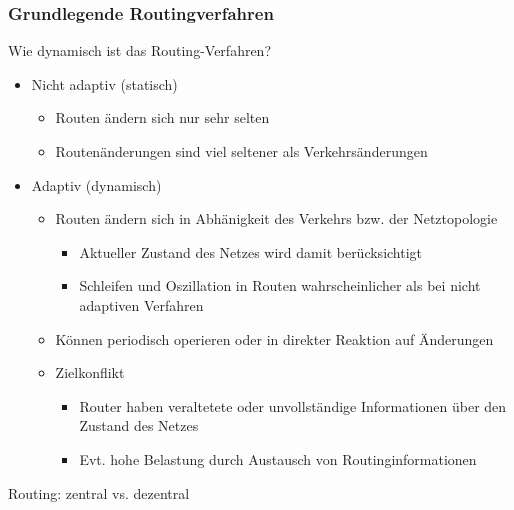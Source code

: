     \subsubsection{Grundlegende Routingverfahren}
      Wie dynamisch ist das Routing-Verfahren?
      \begin{itemize}
        \item Nicht adaptiv (statisch)
          \begin{itemize}
            \item Routen ändern sich nur sehr selten
            \item Routenänderungen sind viel seltener als Verkehrsänderungen
          \end{itemize}
        \item Adaptiv (dynamisch)
          \begin{itemize}
            \item Routen ändern sich in Abhänigkeit des Verkehrs bzw. der Netztopologie
              \begin{itemize}
                \item Aktueller Zustand des Netzes wird damit berücksichtigt
                \item Schleifen und Oszillation in Routen wahrscheinlicher als bei nicht adaptiven
                  Verfahren
              \end{itemize}
            \item Können periodisch operieren oder in direkter Reaktion auf Änderungen
            \item Zielkonflikt
              \begin{itemize}
                \item Router haben veraltetete oder unvollständige Informationen über den Zustand
                  des Netzes
                \item Evt. hohe Belastung durch Austausch von Routinginformationen
              \end{itemize}
          \end{itemize}
      \end{itemize}
      Routing: zentral vs. dezentral
